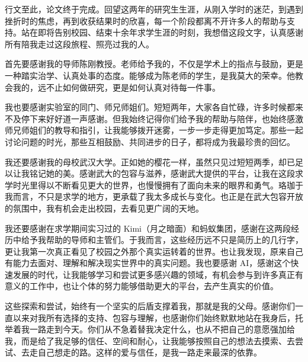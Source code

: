 \documentclass[type = master, class = professional]{whu-thesis}
\begin{document}
\raggedbottom

\setcounter{tocdepth}{1}
\tableofcontents

\mainmatter








\printbibliography

\begin{acknowledgements}
行文至此，论文终于完成。回望这两年的研究生生涯，从刚入学时的迷茫，到遇到挫折时的焦虑，再到收获结果时的欣喜，每一个阶段都离不开许多人的帮助与支持。站在即将告别校园、结束十余年求学生涯的时刻，我想借这段文字，认真感谢所有陪我走过这段旅程、照亮过我的人。

首先要感谢我的导师陈刚教授。老师给予我的，不仅是学术上的指点与鼓励，更是一种踏实治学、认真处事的态度。能够成为陈老师的学生，是我莫大的荣幸。他教会我的，远不止如何做研究，更是如何认真对待每一件事。

我也要感谢实验室的同门、师兄师姐们。短短两年，大家各自忙碌，许多时候都来不及停下来好好道一声感谢。但我始终记得你们给予我的帮助与陪伴，也始终感激师兄师姐们的教导和指引，让我能够拨开迷雾，一步一步走得更加笃定。那些一起讨论问题的时光，那些互相鼓励、共同进步的日子，都将成为我最珍贵的回忆。

我还要感谢我的母校武汉大学。正如她的樱花一样，虽然只见过短短两季，却已足以让我铭记她的美。感谢武大的包容与滋养，感谢武大提供的平台，让我在这段求学时光里得以不断看见更大的世界，也慢慢拥有了面向未来的眼界和勇气。珞珈于我而言，不只是求学的地方，更承载了我太多成长与变化。也正是在武大包容开放的氛围中，我有机会走出校园，去看见更广阔的天地。

我还要感谢在求学期间实习过的 Kimi（月之暗面）和蚂蚁集团，感谢在这两段经历中给予我帮助的导师和主管们。于我而言，这些经历远不只是简历上的几行字，更让我第一次真正看见了校园之外那个真实运转着的世界。也让我发现，原来自己有能力去面对、理解和解决现实世界中的真实问题。我也要感谢 AI，感谢这个快速发展的时代，让我能够学习和尝试更多感兴趣的领域，有机会参与到许多真正有意义的工作中，也让个体的努力能够借助更大的平台，去产生真实的价值。

这些探索和尝试，始终有一个坚实的后盾支撑着我，那就是我的父母。感谢你们一直以来对我所有选择的支持、包容与理解，也感谢你们始终默默地站在我身后，托举着我一路走到今天。你们从不急着替我决定什么，也从不把自己的意愿强加给我，而是给了我足够的信任、空间和耐心，让我能够按照自己的想法去摸索、去尝试、去走自己想走的路。这样的爱与信任，是我一路走来最深的依靠。


\end{acknowledgements}
\end{document}
